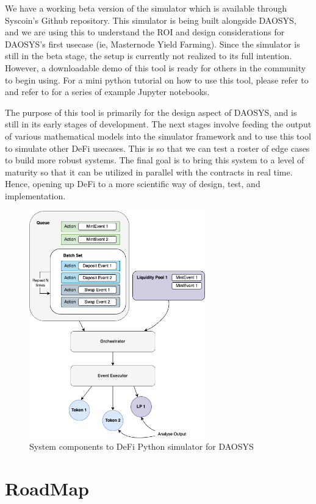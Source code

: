 \documentclass[journal,twocolumn,12pt]{ieeesyscoin}
\begin{document}
We have a working beta version of the simulator which is available through Syscoin’s Github repository. This simulator is being built alongside DAOSYS, and we are using this to understand the ROI and design considerations for DAOSYS’s first usecase (ie, Masternode Yield Farming). Since the simulator is still in the beta stage, the setup is currently not realized to its full intention. However, a downloadable demo of this tool is ready for others in the community to begin using. For a mini python tutorial on how to use this tool, please refer to \cite{Moo22B} and refer to \cite{DAOSim22} for a series of example Jupyter notebooks.

The purpose of this tool is primarily for the design aspect of DAOSYS, and is still in its early stages of development. The next stages involve feeding the output of various mathematical models into the simulator framework and to use this tool to simulate other DeFi usecases. This is so that we can test a roster of edge cases to build more robust systems. The final goal is to bring this system to a level of maturity so that it can be utilized in parallel with the contracts in real time. Hence, opening up DeFi to a more scientific way of design, test, and implementation.

\begin{figure}[h!]
\includegraphics[width=3in]{img/simulator.png}
\caption{System components to DeFi Python simulator for DAOSYS} 
\label{fig:simulator}
\end{figure} 

\section{RoadMap}
\label{sec:roadmap}
\end{document}
